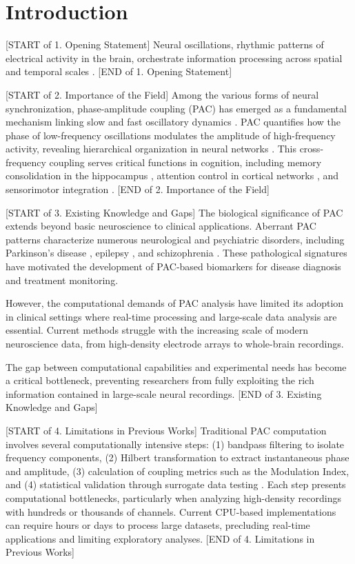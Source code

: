 
\section{Introduction}
\label{sec:introduction}

[START of 1. Opening Statement]
Neural oscillations, rhythmic patterns of electrical activity in the brain, orchestrate information processing across spatial and temporal scales \citep{Buzsaki2004}. 
[END of 1. Opening Statement]

[START of 2. Importance of the Field]
Among the various forms of neural synchronization, phase-amplitude coupling (PAC) has emerged as a fundamental mechanism linking slow and fast oscillatory dynamics \citep{Canolty2010}. PAC quantifies how the phase of low-frequency oscillations modulates the amplitude of high-frequency activity, revealing hierarchical organization in neural networks \citep{Jensen2007}. This cross-frequency coupling serves critical functions in cognition, including memory consolidation in the hippocampus \citep{Tort2008}, attention control in cortical networks \citep{Szczepanski2014}, and sensorimotor integration \citep{deHemptinne2013}.
[END of 2. Importance of the Field]

[START of 3. Existing Knowledge and Gaps]
The biological significance of PAC extends beyond basic neuroscience to clinical applications. Aberrant PAC patterns characterize numerous neurological and psychiatric disorders, including Parkinson's disease \citep{deHemptinne2015}, epilepsy \citep{Amiri2016}, and schizophrenia \citep{Kirihara2012}. These pathological signatures have motivated the development of PAC-based biomarkers for disease diagnosis and treatment monitoring. 

However, the computational demands of PAC analysis have limited its adoption in clinical settings where real-time processing and large-scale data analysis are essential. Current methods struggle with the increasing scale of modern neuroscience data, from high-density electrode arrays to whole-brain recordings.

The gap between computational capabilities and experimental needs has become a critical bottleneck, preventing researchers from fully exploiting the rich information contained in large-scale neural recordings.
[END of 3. Existing Knowledge and Gaps]

[START of 4. Limitations in Previous Works]
Traditional PAC computation involves several computationally intensive steps: (1) bandpass filtering to isolate frequency components, (2) Hilbert transformation to extract instantaneous phase and amplitude, (3) calculation of coupling metrics such as the Modulation Index, and (4) statistical validation through surrogate data testing \citep{Tort2010}. Each step presents computational bottlenecks, particularly when analyzing high-density recordings with hundreds or thousands of channels. Current CPU-based implementations can require hours or days to process large datasets, precluding real-time applications and limiting exploratory analyses.
[END of 4. Limitations in Previous Works]

